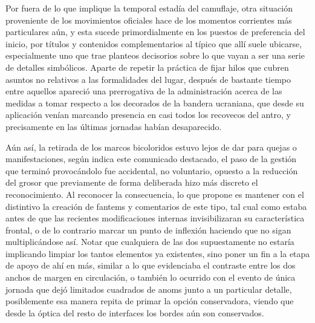 \documentclass[
]{book}
\begin{document}
Por fuera de lo que implique la temporal estadía del camuflaje, otra situación proveniente de los movimientos oficiales hace de los momentos corrientes más particulares aún, y esta sucede primordialmente en los puestos de preferencia del inicio, por títulos y contenidos complementarios al típico que allí suele ubicarse, especialmente uno que trae planteos decisorios sobre lo que vayan a ser una serie de detalles simbólicos. Aparte de repetir la práctica de fijar hilos que cubren asuntos no relativos a las formalidades del lugar, después de bastante tiempo entre aquellos apareció una prerrogativa de la administración acerca de las medidas a tomar respecto a los decorados de la bandera ucraniana, que desde su aplicación venían marcando presencia en casi todos los recovecos del antro, y precisamente en las últimas jornadas habían desaparecido.

Aún así, la retirada de los marcos bicoloridos estuvo lejos de dar para quejas o manifestaciones, según indica este comunicado destacado, el paso de la gestión que terminó provocándolo fue accidental, no voluntario, opuesto a la reducción del grosor que previamente de forma deliberada hizo más discreto el reconocimiento. Al reconocer la consecuencia, lo que propone es mantener con el distintivo la creación de fantems y comentarios de este tipo, tal cual como estaba antes de que las recientes modificaciones internas invisibilizaran su característica frontal, o de lo contrario marcar un punto de inflexión haciendo que no sigan multiplicándose así. Notar que cualquiera de las dos supuestamente no estaría implicando limpiar los tantos elementos ya existentes, sino poner un fin a la etapa de apoyo de ahí en más, similar a lo que evidenciaba el contraste entre los dos anchos de margen en circulación, o también lo ocurrido con el evento de única jornada que dejó limitados cuadrados de anoms junto a un particular detalle, posiblemente esa manera repita de primar la opción conservadora, viendo que desde la óptica del resto de interfaces los bordes aún son conservados.
\end{document}

